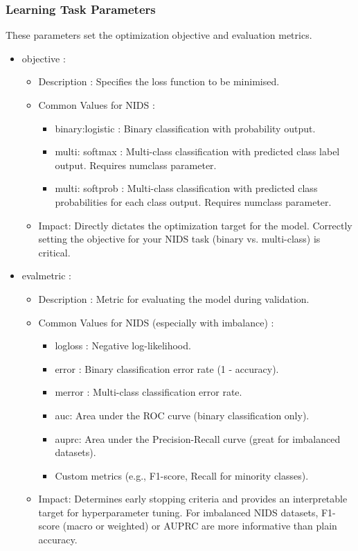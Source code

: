 \subsubsection{Learning Task Parameters} 
These parameters set the optimization objective and evaluation metrics.
\begin{itemize}[noitemsep] 
\item objective : 
\begin{itemize}[noitemsep] 
\item Description : Specifies the loss function to be minimised. 
\item Common Values for NIDS : 
\begin{itemize} 
\item binary:logistic : Binary classification with probability output. 
\item multi: softmax : Multi-class classification with predicted class label output. Requires num\textunderscore class parameter. 
\item multi: softprob : Multi-class classification with predicted class probabilities for each class output. Requires num\textunderscore class parameter. 
\end{itemize} 
\item Impact: Directly dictates the optimization target for the model. Correctly setting the objective for your NIDS task (binary vs. multi-class) is critical.
\end{itemize} 

\item eval\textunderscore metric : 
\begin{itemize}[noitemsep] 
\item Description : Metric for evaluating the model during validation. 
\item Common Values for NIDS (especially with imbalance) :
\begin{itemize} 
\item logloss : Negative log-likelihood. 
\item error : Binary classification error rate (1 - accuracy). 
\item merror : Multi-class classification error rate. 
\item auc: Area under the ROC curve (binary classification only).
\item auprc: Area under the Precision-Recall curve (great for imbalanced datasets).
\item Custom metrics (e.g., F1-score, Recall for minority classes).
\end{itemize} 
\item Impact: Determines early stopping criteria and provides an interpretable target for hyperparameter tuning. For imbalanced NIDS datasets, F1-score (macro or weighted) or AUPRC are more informative than plain accuracy.
\end{itemize} 


\end{itemize}
